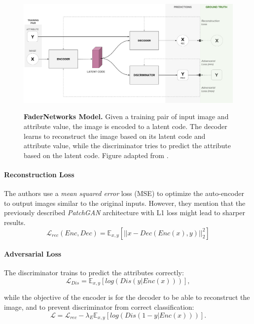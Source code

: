 \documentclass[12pt]{report}
\begin{document}
\begin{figure}[h]
\centering
{\includegraphics[width=\linewidth]{03_analysis/gans/fader}}
\caption{\label{fig:fader_ex} \textbf{FaderNetworks Model.} Given a training pair of input image and attribute value, the image is encoded to a latent code. The decoder learns to reconstruct the image based on its latent code and attribute value, while the discriminator tries to predict the attribute based on the latent code. Figure adapted from \cite{lample_fader_2017}.}
\end{figure}


\paragraph{Reconstruction Loss}
The authors use a \textit{mean squared error} loss (MSE) to optimize the auto-encoder to output images similar to the original inputs. However, they mention that the previously described \textit{PatchGAN} architecture with L1 loss might lead to sharper results.
\begin{equation}
\mathcal{L}_{rec}(Enc,Dec) = \mathbb{E}_{x,y}[||x-Dec(Enc(x),y)||^2_2]
\end{equation}

\paragraph{Adversarial Loss}
The discriminator trains to predict the attributes correctly:
\begin{equation}
\mathcal{L}_{Dis} = \mathbb{E}_{x,y}[log(Dis(y|Enc(x)))],
\end{equation}

while the objective of the encoder is for the decoder to be able to reconstruct the image, and to prevent discriminator from correct classification:
\begin{equation}
\mathcal{L} = \mathcal{L}_{rec} - \lambda_E \mathbb{E}_{x,y}[log(Dis(1-y|Enc(x)))].
\end{equation}
\end{document}
